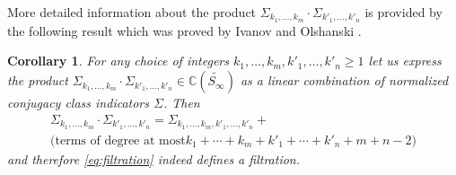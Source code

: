 \documentclass[12pt,dvips]{amsart}
\numberwithin{equation}{section} \numberwithin{figure}{section}
\theoremstyle{plain}
\newtheorem{corollary}[lemma]{Corollary}
\theoremstyle{definition}
\theoremstyle{remark}
\newcommand{\C}{{\mathbb{C}}}
\newcommand{\Sn}[1]{{{S}}_{#1}}
\newcommand{\PartPerm}[1]{\widetilde{\Sn{#1}}}
\begin{document}
More detailed information about the product $\Sigma_{k_1,\dots,k_m}
\cdot \Sigma_{k'_1,\dots,k'_n}$ is provided by the following result
which was proved by Ivanov and Olshanski \cite{IvanovOlshanski2002}.
\begin{corollary}
\label{cor:filtration} For any choice of integers
$k_1,\dots,k_m,k'_1,\dots,k'_n\geq 1$ let us express the product
$\Sigma_{k_1,\dots,k_m} \cdot
\Sigma_{k'_1,\dots,k'_n}\in\C(\PartPerm{\infty})$ as a linear
combination of normalized conjugacy class indicators $\Sigma$. Then
\begin{multline*}
\Sigma_{k_1,\dots,k_m} \cdot \Sigma_{k'_1,\dots,k'_n} =
\Sigma_{k_1,\dots,k_m,k'_1,\dots,k'_n} + \\
\text{(terms of degree at most
$k_1+\cdots+k_m+k'_1+\cdots+k'_n+m+n-2$)}
\end{multline*}
and therefore \eqref{eq:filtration} indeed defines a filtration.
\end{corollary}

\end{document}
